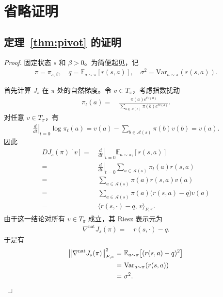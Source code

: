 \section{省略证明}

\subsection{定理~\ref{thm:pivot} 的证明}

\begin{proof}
固定状态 $s$ 和 $\beta>0$。为简便起见，记
\begin{align*}
\pi = \pi_{s,\beta}, \quad
q = \mathbb E_{a\sim\pi}[r(s,a)], \quad
\sigma^2 = \mathrm{Var}_{a\sim\pi}(r(s,a)).
\end{align*}

首先计算 $J_s$ 在 $\pi$ 处的自然梯度。令 $v\in T_\pi$，考虑指数扰动
\begin{align*}
\pi_t(a)= &~ \frac{\pi(a)e^{t v(a)}}{\sum_{b\in\mathcal{A}(s) }\pi(b)e^{t v(b)}}.
\end{align*}
对任意 $v\in T_\pi$，有
\begin{align*}
\left.\frac{d}{dt}\right|_{t=0}\log \pi_t(a)
= v(a)-\sum_{b\in\mathcal{A}(s) }\pi(b)v(b)
= v(a).
\end{align*}
因此
\begin{align*}
DJ_s(\pi)[v]
= &~ \left.\frac{d}{dt}\right|_{t=0}\mathbb E_{a\sim\pi_t}[r(s,a)] \\
= &~ \left.\frac{d}{dt}\right|_{t=0}\sum_{a\in\mathcal{A}(s) }\pi_t(a)r(s,a) \\
= &~ \sum_{a\in\mathcal{A}(s) }\pi(a)r(s,a)v(a) \\
= &~ \sum_{a\in\mathcal{A}(s) }\pi(a)\bigl(r(s,a)-q\bigr)v(a) \\
= &~ \langle r(s,\cdot)-q,\,v\rangle_{F,\pi}.
\end{align*}
由于这一结论对所有 $v\in T_\pi$ 成立，其 Riesz 表示元为
\begin{align*}
\nabla^{\mathrm{nat}}J_s(\pi)= &~ r(s,\cdot)-q.
\end{align*}
于是有
\begin{align}\label{eq:norm-natural-J}
\bigl\|\nabla^{\mathrm{nat}}J_s(\pi)\bigr\|_{F,\pi}^2
= &~ \mathbb E_{a\sim\pi}\bigl[(r(s,a)-q)^2\bigr] \notag\\
= &~ \mathrm{Var}_{a\sim\pi}(r(s,a)) \notag\\
= &~ \sigma^2.
\end{align}


\end{proof}

